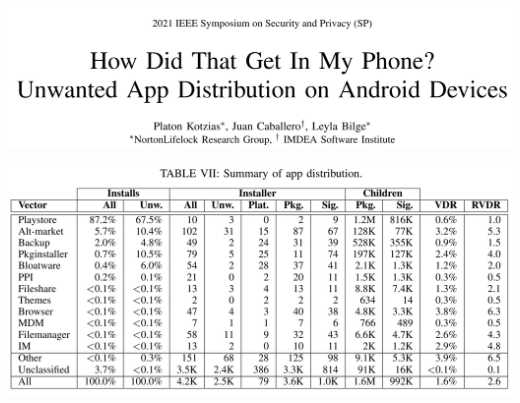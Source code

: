 \begin{frame}
\includegraphics[width=\textwidth]{../intro/kotzias-on-device-title}
\end{frame}

\begin{frame}
\includegraphics[width=\textwidth]{../intro/kotzias-install-src-tbl}
\end{frame}
